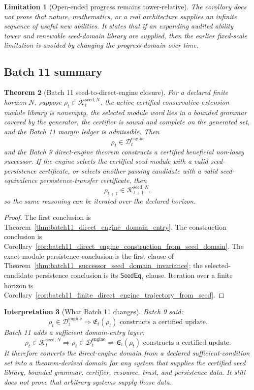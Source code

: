 \documentclass[11pt]{article}
\newtheorem{theorem}{Theorem}[section]
\newtheorem{interpretation}[theorem]{Interpretation}
\newtheorem{limitation}[theorem]{Limitation}
\newcommand{\1}{\mathbf{1}}
\providecommand{\Dcal}{\mathcal{D}}
\providecommand{\Kcal}{\mathcal{K}}
\begin{document}
\begin{limitation}[Open-ended progress remains tower-relative]
The corollary does not prove that nature, mathematics, or a real architecture supplies an infinite sequence of useful new abilities.  It states that if an expanding audited ability tower and renewable seed-domain library are supplied, then the earlier fixed-scale limitation is avoided by changing the progress domain over time.
\end{limitation}

\subsection{Batch 11 summary}

\begin{theorem}[Batch 11 seed-to-direct-engine closure]
\label{thm:batch11_seed_to_direct_engine_closure}
For a declared finite horizon \(N\), suppose \(\rho_t\in\Kcal_t^{\mathrm{seed},N}\), the active certified conservative-extension module library is nonempty, the selected module word lies in a bounded grammar covered by the generator, the certifier is sound and complete on the generated set, and the Batch 11 margin ledger is admissible.  Then
\[
\rho_t\in\Dcal_t^{\mathrm{engine}}
\]
and the Batch 9 direct-engine theorem constructs a certified beneficial non-lossy successor.  If the engine selects the certified seed module with a valid seed-persistence certificate, or selects another passing candidate with a valid seed-equivalence persistence-transfer certificate, then
\[
\rho_{t+1}\in\Kcal_{t+1}^{\mathrm{seed},N},
\]
so the same reasoning can be iterated over the declared horizon.
\end{theorem}

\begin{proof}
The first conclusion is Theorem~\ref{thm:batch11_direct_engine_domain_entry}.  The construction conclusion is Corollary~\ref{cor:batch11_direct_engine_construction_from_seed_domain}.  The exact-module persistence conclusion is the first clause of Theorem~\ref{thm:batch11_successor_seed_domain_invariance}; the selected-candidate persistence conclusion is its \(\mathsf{SeedEq}_t\) clause.  Iteration over a finite horizon is Corollary~\ref{cor:batch11_finite_direct_engine_trajectory_from_seed}.
\end{proof}

\begin{interpretation}[What Batch 11 changes]
Batch 9 said:
\[
\rho_t\in\Dcal_t^{\mathrm{engine}}
\Longrightarrow
\mathfrak E_t(\rho_t)\text{ constructs a certified update}.
\]
Batch 11 adds a sufficient domain-entry layer:
\[
\rho_t\in\Kcal_t^{\mathrm{seed},N}
\Longrightarrow
\rho_t\in\Dcal_t^{\mathrm{engine}}
\Longrightarrow
\mathfrak E_t(\rho_t)\text{ constructs a certified update}.
\]
It therefore converts the direct-engine domain from a declared sufficient-condition set into a theorem-derived domain for any system that supplies the certified seed library, bounded grammar, certifier, resource, trust, and persistence data.  It still does not prove that arbitrary systems supply those data.
\end{interpretation}
\end{document}
